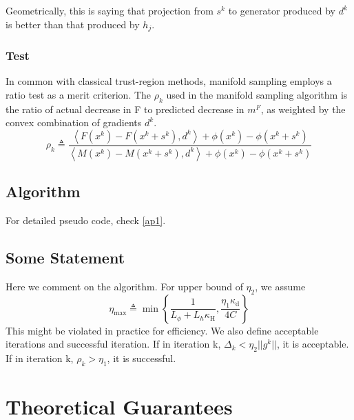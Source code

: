 \documentclass[10pt, oneside]{article}
\begin{document}
Geometrically, this is saying that projection from $s^k$ to generator produced by $d^k$ is better than that produced by $h_j$. 

\subsubsection{Test}
In common with classical trust-region methods, manifold sampling employs a ratio test as a merit criterion. The $\rho_k$ used in the manifold sampling algorithm is the ratio of actual decrease in F to predicted decrease in $m^F$, as weighted by the convex combination of gradients $d^k$.
\begin{equation}
\label{rho}
\rho_{k} \triangleq \frac{\left\langle F\left(x^{k}\right)-F\left(x^{k}+s^{k}\right), d^{k}\right\rangle+\phi(x^k)-\phi(x^k+s^k)}{\left\langle M\left(x^{k}\right)-M\left(x^{k}+s^{k}\right), d^{k}\right\rangle+\phi(x^k)-\phi(x^k+s^k)}
\end{equation}

\subsection{Algorithm}
For detailed pseudo code, check \ref{ap1}.


\subsection{Some Statement}
Here we comment on the algorithm. For upper bound of $\eta_2$, we assume 
\begin{equation}
\label{etamax}
\eta_{\max } \triangleq \min \left\{\frac{1}{L_{\phi}+L_{h} \kappa_{\mathrm{H}}}, \frac{\eta_{1} \kappa_{\mathrm{d}}}{4 C}\right\}
\end{equation}
This might be violated in practice for efficiency. 
We also define acceptable iterations and successful iteration. If in iteration k, $\Delta_k<\eta_2||g^k||$, it is acceptable. If in iteration k, $ \rho_k>\eta_1$, it is successful. 



\section{Theoretical Guarantees}
\end{document}
